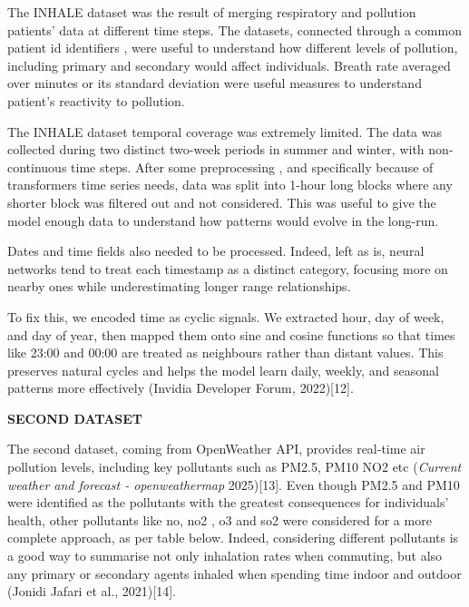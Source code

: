 \documentclass[
]{article}
\begin{document}
The INHALE dataset was the result of merging respiratory and pollution
patients' data at different time steps. The datasets, connected through
a common patient id identifiers , were useful to understand how
different levels of pollution, including primary and secondary would
affect individuals. Breath rate averaged over minutes or its standard
deviation were useful measures to understand patient's reactivity to
pollution.

The INHALE dataset temporal coverage was extremely limited. The data was
collected during two distinct two-week periods in summer and winter,
with non-continuous time steps. After some preprocessing , and
specifically because of transformers time series needs, data was split
into 1-hour long blocks where any shorter block was filtered out and not
considered. This was useful to give the model enough data to understand
how patterns would evolve in the long-run.

Dates and time fields also needed to be processed. Indeed, left as is,
neural networks tend to treat each timestamp as a distinct category,
focusing more on nearby ones while underestimating longer range
relationships.

To fix this, we encoded time as cyclic signals. We extracted hour, day
of week, and day of year, then mapped them onto sine and cosine
functions so that times like 23:00 and 00:00 are treated as neighbours
rather than distant values. This preserves natural cycles and helps the
model learn daily, weekly, and seasonal patterns more effectively
(Invidia Developer Forum\emph{,} 2022){[}12{]}.

\textbf{SECOND DATASET}

The second dataset, coming from OpenWeather API, provides real-time air
pollution levels, including key pollutants such as PM2.5, PM10 NO2 etc
(\emph{Current weather and forecast - openweathermap} 2025){[}13{]}.
Even though PM2.5 and PM10 were identified as the pollutants with the
greatest consequences for individuals' health, other pollutants like no,
no2 , o3 and so2 were considered for a more complete approach, as per
table below. Indeed, considering different pollutants is a good way to
summarise not only inhalation rates when commuting, but also any primary
or secondary agents inhaled when spending time indoor and outdoor
(Jonidi Jafari et al., 2021){[}14{]}.
\end{document}
